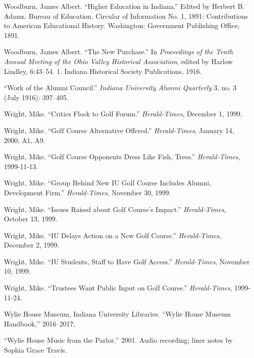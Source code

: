 \documentclass[
  american,
  letterpaper,
]{scrreprt}
\newlength{\cslhangindent}
\newenvironment{CSLReferences}[2] %
 {\begin{list}{}{%
  \setlength{\itemindent}{0pt}
  \setlength{\leftmargin}{0pt}
  \setlength{\parsep}{0pt}
  \ifodd #1
   \setlength{\leftmargin}{\cslhangindent}
   \setlength{\itemindent}{-1\cslhangindent}
  \fi
  \setlength{\itemsep}{#2\baselineskip}}}
 {\end{list}}
\begin{document}
\begin{CSLReferences}{1}{0}
Woodburn, James Albert. {``Higher Education in Indiana.''} Edited by
Herbert B. Adams. Bureau of Education, Circular of Information No. 1,
1891: Contributions to American Educational History. Washington:
Government Publishing Office, 1891.

Woodburn, James Albert. {``The New Purchase.''} In \emph{Proceedings of
the Tenth Annual Meeting of the Ohio Valley Historical Association},
edited by Harlow Lindley, 6:43--54. 1. Indiana Historical Society
Publications, 1916.

{``Work of the Alumni Council.''} \emph{Indiana University Alumni
Quarterly} 3, no. 3 (July 1916): 397--405.

Wright, Mike. {``Critics Flock to Golf Forum.''} \emph{Herald-Times},
December 1, 1999.

Wright, Mike. {``Golf Course Alternative Offered.''}
\emph{Herald-Times}, January 14, 2000, A1, A9.

Wright, Mike. {``Golf Course Opponents Dress Like Fish, Trees.''}
\emph{Herald-Times}, 1999-11-13.

Wright, Mike. {``Group Behind New IU Golf Course Includes Alumni,
Development Firm.''} \emph{Herald-Times}, November 30, 1999.

Wright, Mike. {``Issues Raised about Golf Course's Impact.''}
\emph{Herald-Times}, October 13, 1999.

Wright, Mike. {``IU Delays Action on a New Golf Course.''}
\emph{Herald-Times}, December 2, 1999.

Wright, Mike. {``IU Students, Staff to Have Golf Access.''}
\emph{Herald-Times}, November 10, 1999.

Wright, Mike. {``Trustees Want Public Input on Golf Course.''}
\emph{Herald-Times}, 1999-11-24.

Wylie House Museum, Indiana University Libraries. {``Wylie House Museum
Handbook,''} 2016--2017.

{``Wylie House Music from the Parlor,''} 2001. Audio recording; liner
notes by Sophia Grace Travis.


\end{CSLReferences}
\end{document}

